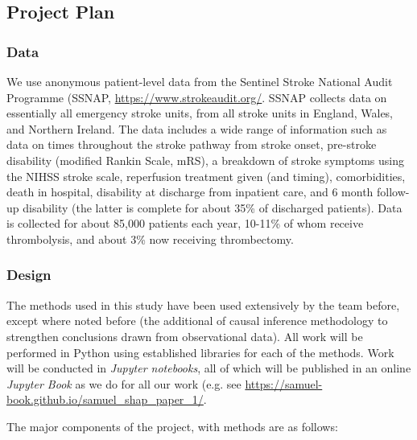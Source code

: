 \subsection{Project Plan}

\subsubsection{Data}

We use anonymous patient-level data from the Sentinel Stroke National Audit Programme (SSNAP, \url{https://www.strokeaudit.org/}. SSNAP collects data on essentially all emergency stroke units, from all stroke units in England, Wales, and Northern Ireland. The data includes a wide range of information such as data on times throughout the stroke pathway from stroke onset, pre-stroke disability (modified Rankin Scale, mRS), a breakdown of stroke symptoms using the NIHSS stroke scale, reperfusion treatment given (and timing), comorbidities, death in hospital, disability at discharge from inpatient care, and 6 month follow-up disability (the latter is complete for about 35\% of discharged patients). Data is collected for about 85,000 patients each year, 10-11\% of whom receive thrombolysis, and about 3\% now receiving thrombectomy.

\subsubsection{Design}

The methods used in this study have been used extensively by the team before, except where noted before (the additional of causal inference methodology to strengthen conclusions drawn from observational data). All work will be performed in Python using established libraries for each of the methods. Work will be conducted in \textit{Jupyter notebooks}, all of which will be published in an online \textit{Jupyter Book} as we do for all our work (e.g. see \url{https://samuel-book.github.io/samuel_shap_paper_1/}.

The major components of the project, with methods are as follows:

